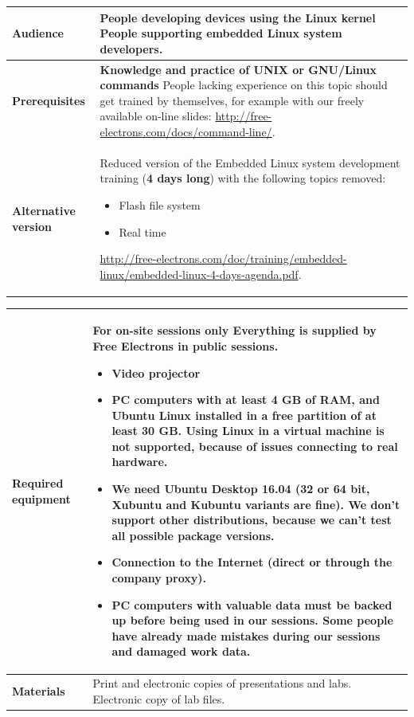 \documentclass[a4paper,12pt,obeyspaces,spaces,hyphens]{article}
\begin{document}
{\begin{tabularx}{\textwidth}{|g|h|}
    {\bf Audience} & People developing devices using the Linux kernel
    \newline People supporting embedded Linux system developers. \\
    \hline

    {\bf Prerequisites} &
    {\bf Knowledge and practice of UNIX or GNU/Linux commands}
    \newline People lacking experience on this topic should get
    trained by themselves, for example with our freely available
    on-line slides:
    \newline \url{http://free-electrons.com/docs/command-line/}. \\
    \hline

    {\bf Alternative version} & Reduced version of the Embedded Linux
    system development training ({\bf 4 days long}) with the following
    topics removed:
    \begin{itemize}
    \item Flash file system
    \item Real time
    \end{itemize}
    \url{http://free-electrons.com/doc/training/embedded-linux/embedded-linux-4-days-agenda.pdf}. \\
    \hline

  \end{tabularx}

  \begin{tabularx}{\textwidth}{|g|h|}
    {\bf Required equipment} &
    {\bf For on-site sessions only}
    \newline Everything is supplied by Free Electrons in public sessions.
    \begin{itemize}
    \item Video projector
    \item PC computers with at least 4 GB of RAM, and Ubuntu Linux
    installed in a {\bf free partition of at least 30 GB. Using Linux
      in a virtual machine is not supported}, because of issues
    connecting to real hardware.
    \item We need Ubuntu Desktop 16.04 (32 or 64 bit, Xubuntu and
    Kubuntu variants are fine). We don't support other
    distributions, because we can't test all possible package versions.
    \item {\bf Connection to the Internet} (direct or through the
    company proxy).
    \item {\bf PC computers with valuable data must be backed up}
    before being used in our sessions.  Some people have already made
    mistakes during our sessions and damaged work data.
    \end{itemize}\\
    \hline

    {\bf Materials} & Print and electronic copies of presentations and
    labs.
    \newline Electronic copy of lab files.\\
    \hline

\end{tabularx}}
\normalsize
\end{document}
